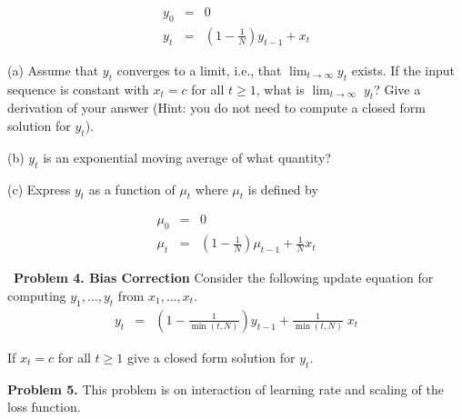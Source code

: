 \documentclass{article}
\newcommand{\solution}[1]{}
\begin{document}
\begin{eqnarray*}
  y_0  & = & 0 \\
  y_t & = & \left(1 - \frac{1}{N}\right)y_{t-1} + x_t
\end{eqnarray*}

(a) Assume that $y_t$ converges to a limit, i.e., that $\lim_{t \rightarrow \infty} y_t$ exists.
If the input sequence is constant with $x_t = c$ for all $t \geq 1$, what is $\lim_{t \rightarrow \infty}\;y_t$?  Give a derivation of your answer
(Hint: you do not need to compute a closed form solution for $y_t$).

\solution{

  The limit $y_\infty$ must satisfy
  $$y_\infty = \left(1-\frac{1}{N}\right)y_\infty + c$$
  giving $y_\infty = Nc$.
}

\medskip
(b) $y_t$ is an exponential moving average of what quantity?

\solution{
  The update can be rewritten as
  $$y_t = \left(1 - \frac{1}{N}\right)y_{t-1} + \frac{1}{N}(Nx_t)$$
  so $y_t$ is an exponential moving average of $Nx_t$.
}

\medskip
(c) Express $y_t$ as a function of $\mu_t$ where $\mu_t$ is defined by

\begin{eqnarray*}
  \mu_0  & = & 0 \\
  \mu_t & = & \left(1 - \frac{1}{N}\right)\mu_{t-1} + \frac{1}{N}x_t
\end{eqnarray*}

\solution{
  $y_t$ is an exponential moving average of $Nx_t$ which equals $N$ times the moving average of $x_t$ so we have
  $$y_t = N \mu_t$$
}

\bigskip
~{\bf Problem 4.  Bias Correction}
Consider the following update equation for computing $y_1,\ldots,y_t$ from $x_1,\ldots,x_t$.
\begin{eqnarray*}
  y_t & = & \left(1 - \frac{1}{\min(t,N)}\right)y_{t-1} + \frac{1}{\min(t,N)}\;x_t
\end{eqnarray*}

If $x_t = c$ for all $t \geq 1$ give a closed form solution for $y_t$.

\solution{
  For $t = 1$ we get $y_1 = x_1 = c$.  We then get that $y_{t+1}$ is a convex combination of $y_t$ and $x_t$ which maintains the invariant that $y_t = c$.
}

\bigskip
{\bf Problem 5.}  This problem is on interaction of learning rate and scaling of the loss function.

    \medskip
\end{document}
